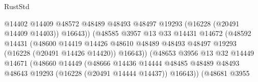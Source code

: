 \begin{lexlean}{RustStd}
\begin{coremodule}
                                              @14402
                                              @14409
                                              @48572
                                              @48489
                                              @48493
                                              @48497
                                              @19293
                                              (@16228 (@20491 @14409 @14403))
                                              @16643))
                                          (@48585
                                            @3957
                                            @13
                                            @33
                                            @14431
                                            @14672
                                            (@48592
                                              @14431
                                              (@48600
                                                @14419
                                                @14426
                                                @48610
                                                @48489
                                                @48493
                                                @48497
                                                @19293
                                                (@16228 (@20491 @14426 @14420))
                                                @16643))
                                            (@48653
                                              @3956
                                              @13
                                              @32
                                              @14449
                                              @14671
                                              (@48660
                                                @14449
                                                (@48666
                                                  @14436
                                                  @14444
                                                  @48485
                                                  @48489
                                                  @48493
                                                  @48643
                                                  @19293
                                                  (@16228 (@20491 @14444 @14437))
                                                  @16643))
                                              (@48681
                                                @3955

\end{coremodule}
\end{lexlean}
